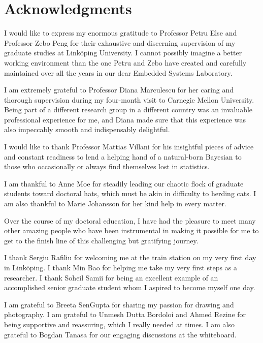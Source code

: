 \chapter*{Acknowledgments}
\newcommand\person[2]{#2 #1}

I would like to express my enormous gratitude to Professor \person{Else}{Petru}
and Professor \person{Peng}{Zebo} for their exhaustive and discerning
supervision of my graduate studies at Linköping University. I cannot possibly
imagine a better working environment than the one Petru and Zebo have created
and carefully maintained over all the years in our dear Embedded Systems
Laboratory.

I am extremely grateful to Professor \person{Marculescu}{Diana} for her caring
and thorough supervision during my four-month visit to Carnegie Mellon
University. Being part of a different research group in a different country was
an invaluable professional experience for me, and Diana made sure that this
experience was also impeccably smooth and indispensably delightful.

I would like to thank Professor \person{Villani}{Mattias} for his insightful
pieces of advice and constant readiness to lend a helping hand of a natural-born
Bayesian to those who occasionally or always find themselves lost in statistics.

I am thankful to \person{Moe}{Anne} for steadily leading our chaotic flock of
graduate students toward doctoral hats, which must be akin in difficulty to
herding cats. I am also thankful to \person{Johansson}{Marie} for her kind help
in every matter.

Over the course of my doctoral education, I have had the pleasure to meet many
other amazing people who have been instrumental in making it possible for me to
get to the finish line of this challenging but gratifying journey.

I thank \person{Rafiliu}{Sergiu} for welcoming me at the train station on my
very first day in Linköping. I thank \person{Bao}{Min} for helping me take my
very first steps as a researcher. I thank \person{Samii}{Soheil} for being an
excellent example of an accomplished senior graduate student whom I aspired to
become myself one day.

I am grateful to \person{SenGupta}{Breeta} for sharing my passion for drawing
and photography. I am grateful to \person{Dutta Bordoloi}{Unmesh} and
\person{Rezine}{Ahmed} for being supportive and reassuring, which I really
needed at times. I am also grateful to \person{Tanasa}{Bogdan} for our engaging
discussions at the whiteboard.


